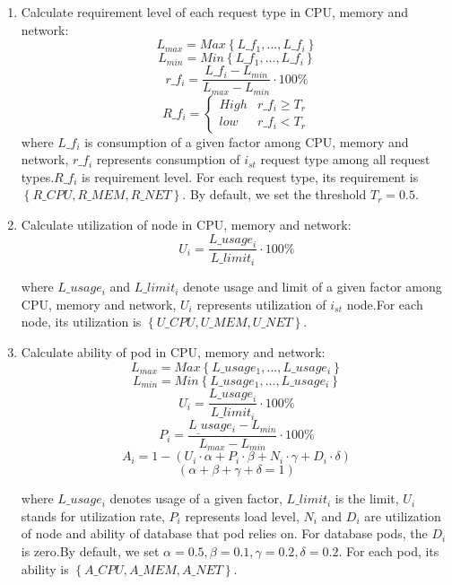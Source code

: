 \begin{enumerate}
 \item Calculate requirement level of each request type in CPU, memory and network:
       $$L_{max} = Max\left \{ L\_f_1,...,L\_f_i \right \}$$
       $$L_{min} = Min\left \{ L\_f_1,...,L\_f_i \right \}$$
       $$r\_f_i =  \frac{L\_f_i - L_{min}}{L_{max} - L_{min}} \cdot 100\%$$
       $$R\_f_i=\left\{
       \begin{matrix}
        High & r\_f_i\geq T_r \\
        low  & r\_f_i < T_r
       \end{matrix}
       \right.$$
       where $L\_f_i$ is consumption of a given factor among CPU, memory and network, $r\_f_i$ represents consumption of  $i_{st}$ request type among all request types.$R\_f_i$ is requirement level. For each request type, its requirement is $\left \{ R\_CPU, R\_MEM, R\_NET \right\}$. By default, we set the threshold $T_r = 0.5$.

 \item Calculate utilization of node in CPU, memory and network:
       $$U_i = \frac{{L\_usage}_i}{{L\_limit}_i} \cdot 100\%$$


       where $L\_usage_i$ and $L\_limit_i$ denote usage and limit of a given factor among CPU, memory and network, $U_i$ represents utilization of $i_{st}$ node.For each node, its utilization is $\left \{U\_CPU, U\_MEM, U\_NET\right\}$.

 \item Calculate ability of pod in CPU, memory and network:
       $$L_{max} = Max\left \{ L\_usage_1,...,L\_usage_i \right \}$$
       $$L_{min} = Min\left \{ L\_usage_1,...,L\_usage_i \right \}$$
       $$U_i = \frac{{L\_usage}_i}{{L\_limit}_i} \cdot 100\%$$
       $$P_i = \frac{L_\_usage_i - L_{min}}{L_{max} - L_{min}} \cdot 100\%$$
       $$A_i = 1- \left ( U_i \cdot \alpha + P_i \cdot \beta + N_i \cdot \gamma + D_i \cdot \delta\right )$$
       $$\left ( \alpha + \beta + \gamma + \delta = 1 \right ) $$

       where $L\_usage_i$ denotes usage of a given factor, $L\_limit_i$ is the limit, $U_i$ stands for utilization rate, $P_i$ represents load level, $N_i$ and $D_i$ are utilization of node and ability of database that  pod relies on. For database pods, the $D_i$ is zero.By default, we set $\alpha = 0.5, \beta = 0.1, \gamma = 0.2, \delta = 0.2$. For each pod, its ability is $\left \{A\_CPU, A\_MEM, A\_NET\right\}$.
\end{enumerate}

